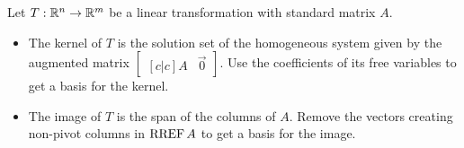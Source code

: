 \begin{applicationActivities}
\begin{observation}
Let  $T:\mathbb{R}^n\to\mathbb{R}^m$ be a linear transformation with standard matrix $A$.

\begin{itemize}
\item The kernel of \(T\) is the solution set of the homogeneous system given
by the augmented matrix $\begin{bmatrix}[c|c]A&\vec 0\end{bmatrix}$.
Use the coefficients of its free variables to get a basis for the kernel.
\item The image of \(T\) is the span of the columns of \(A\). Remove
the vectors creating non-pivot columns in \(\operatorname{RREF} A\) to get a basis
for the image.
\end{itemize}
\end{observation}

\end{applicationActivities}
